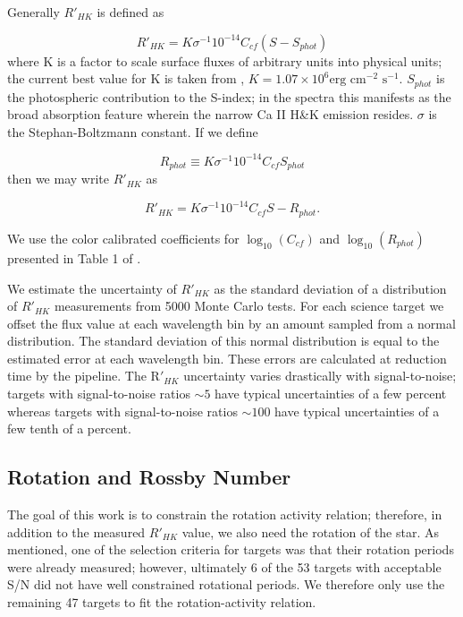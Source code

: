 Generally $R'_{HK}$ is defined as

\begin{equation}\label{eqn:RpHKDef}
    R'_{HK} = K\sigma^{-1}10^{-14}C_{cf}(S-S_{phot})
\end{equation}
where K is a factor to scale surface fluxes of arbitrary units into physical
units; the current best value for K is taken from \citet{Hal07},
$K=1.07\times10^{6}\text{erg cm$^{-2}$ s$^{-1}$}$. $S_{phot}$ is the
photospheric contribution to the S-index; in the spectra this manifests as the
broad absorption feature wherein the narrow Ca II H\&K emission resides.
$\sigma$ is the Stephan-Boltzmann constant. If we define 

\begin{equation}
    R_{phot}\equiv K\sigma^{-1}10^{-14}C_{cf}S_{phot}
\end{equation}
then we may write $R'_{HK}$ as 

\begin{equation}\label{eqn:RpHKFinal}
    R'_{HK} = K\sigma^{-1}10^{-14}C_{cf}S - R_{phot}.
\end{equation}

We use the color calibrated coefficients for $\log_{10}(C_{cf})$ and
$\log_{10}(R_{phot})$ presented in Table 1 of \citet{Def17}.

We estimate the uncertainty of $R'_{HK}$ as the standard deviation of a
distribution of $R'_{HK}$ measurements from 5000 Monte Carlo tests. For each
science target we offset the flux value at each wavelength bin by an amount
sampled from a normal distribution. The standard deviation of this normal
distribution is equal to the estimated error at each wavelength bin. These
errors are calculated at reduction time by the pipeline. The R$'_{HK}$
uncertainty varies drastically with signal-to-noise; targets with
signal-to-noise ratios $\sim 5$ have typical uncertainties of a few percent
whereas targets with signal-to-noise ratios $\sim 100$ have typical
uncertainties of a few tenth of a percent.

\subsection{Rotation and Rossby Number}
The goal of this work is to constrain the rotation activity relation;
therefore, in addition to the measured $R'_{HK}$ value, we also need the
rotation of the star. As mentioned, one of the selection criteria for targets
was that their rotation periods were already measured; however, ultimately
6 of the 53 targets with acceptable S/N did not have well constrained
rotational periods. We therefore only use the remaining 47 targets to fit the
rotation-activity relation. 


